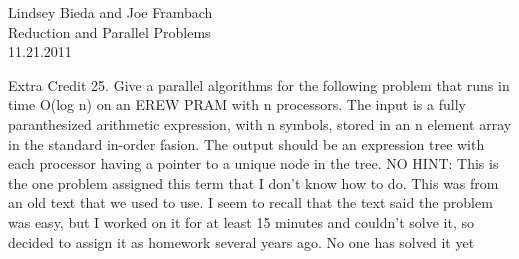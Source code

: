 \documentclass[10pt]{article}
\begin{document}
	\begin{flushright}
	Lindsey Bieda and Joe Frambach\\
	Reduction and Parallel Problems\\
	11.21.2011
	\end{flushright}

Extra Credit 25. Give a parallel algorithms for the following problem that runs in time O(log n) on an EREW PRAM
with n processors. The input is a fully paranthesized arithmetic expression, with n symbols, stored in
an n element array in the standard in-order fasion. The output should be an expression tree with each
processor having a pointer to a unique node in the tree.
NO HINT: This is the one problem assigned this term that I don't know how to do. This was from an
old text that we used to use. I seem to recall that the text said the problem was easy, but I worked on
it for at least 15 minutes and couldn't solve it, so decided to assign it as homework several years ago.
No one has solved it yet
\end{document}
